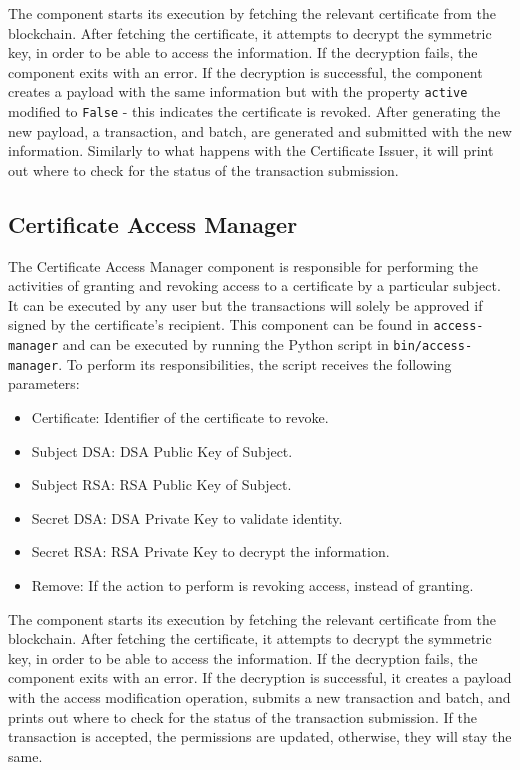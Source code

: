 The component starts its execution by fetching the relevant certificate from the blockchain. After fetching the certificate, it attempts to decrypt the symmetric key, in order to be able to access the information. If the decryption fails, the component exits with an error. If the decryption is successful, the component creates a payload with the same information but with the property \texttt{active} modified to \texttt{False} - this indicates the certificate is revoked. After generating the new payload, a transaction, and batch, are generated and submitted with the new information. Similarly to what happens with the Certificate Issuer, it will print out where to check for the status of the transaction submission.

\subsection{Certificate Access Manager}

The Certificate Access Manager component is responsible for performing the activities of granting and revoking access to a certificate by a particular subject. It can be executed by any user but the transactions will solely be approved if signed by the certificate's recipient. This component can be found in \texttt{access-manager} and can be executed by running the Python script in \texttt{bin/access-manager}. To perform its responsibilities, the script receives the following parameters:

\begin{itemize}
	\item Certificate: Identifier of the certificate to revoke.
	\item Subject DSA: DSA Public Key of Subject.
	\item Subject RSA: RSA Public Key of Subject.
	\item Secret DSA: DSA Private Key to validate identity.
	\item Secret RSA: RSA Private Key to decrypt the information.
	\item Remove: If the action to perform is revoking access, instead of granting.
\end{itemize}

The component starts its execution by fetching the relevant certificate from the blockchain. After fetching the certificate, it attempts to decrypt the symmetric key, in order to be able to access the information. If the decryption fails, the component exits with an error. If the decryption is successful, it creates a payload with the access modification operation, submits a new transaction and batch, and prints out where to check for the status of the transaction submission. If the transaction is accepted, the permissions are updated, otherwise, they will stay the same.

